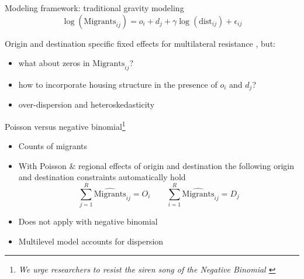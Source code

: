 \documentclass{beamer}
\begin{document}
\begin{frame}{Modeling framework: traditional gravity modeling}
	\begin{equation*}
	\log(\text{Migrants}_{ij}) = o_i + d_j + \gamma\log(\text{dist}_{ij}) + \epsilon_{ij}
	\label{eq:gravfixed}
	\end{equation*} 
	
	Origin and destination specific \alert{fixed} effects for multilateral resistance  \citep{anderson2003gravity}, but:
	\begin{itemize}
		\item what about \alert{zeros} in $\text{Migrants}_{ij}$?
		\item how to incorporate \alert{housing} structure in the presence of $o_i$ and $d_j$?
		\item \alert{over-dispersion} and \alert{heteroskedasticity} \footnotesize{\citep{silva2006log} }
	\end{itemize}
\end{frame}

\begin{frame}{Poisson versus negative binomial\footnote{
			\emph{We urge researchers to resist the siren song of the Negative
			Binomial \footnotesize{ \citep{head2014gravity}} }
			}}
	
	\begin{itemize}
		\item Counts of migrants\newline 
		\item 	With Poisson \& regional effects of origin and destination the following origin and destination \alert{constraints} automatically hold
		$$
		\sum_{j=1}^{R} {\widehat{\text{Migrants} }_{ij} } = O_i \qquad \sum_{i=1}^{R} {\widehat{\text{Migrants} }_{ij} } = D_j
		$$

	\item  Does not apply with negative binomial \newline
	\item Multilevel model accounts for dispersion
		\end{itemize}

\end{frame}
\end{document}
